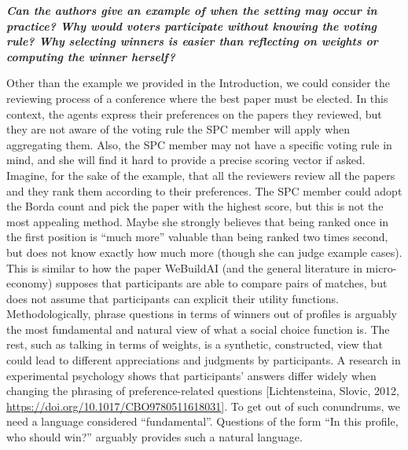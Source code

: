 \documentclass{article}
\begin{document}
\textit{\textbf{Can the authors give an example of when the setting may occur in practice? Why would voters participate without knowing the voting rule? Why selecting winners is easier than reflecting on weights or computing the winner herself?}}

Other than the example we provided in the Introduction, we could consider the reviewing process of a conference where the best paper must be elected. In this context, the agents express their preferences on the papers they reviewed, but they are not aware of the voting rule the SPC member will apply when aggregating them. %
Also, the SPC member may not have a specific voting rule in mind, and she will find it hard to provide a precise scoring vector if asked. Imagine, for the sake of the example, that all the reviewers review all the papers and they rank them according to their preferences. The SPC member could adopt the Borda count and pick the paper with the highest score, but this is not the most appealing method. Maybe she strongly believes that being ranked once in the first position is “much more” valuable than being ranked two times second, but does not know exactly how much more (though she can judge example cases). This is similar to how the paper WeBuildAI (and the general literature in micro-economy) supposes that participants are able to compare pairs of matches, but does not assume that participants can explicit their utility functions. Methodologically, phrase questions in terms of winners out of profiles is arguably the most fundamental and natural view of what a social choice function is. The rest, such as talking in terms of weights, is a synthetic, constructed, view that could lead to different appreciations and judgments by participants.
A research in experimental psychology shows that participants’ answers differ widely when changing the phrasing of preference-related questions [Lichtensteina, Slovic, 2012, \url{https://doi.org/10.1017/CBO9780511618031}].
To get out of such conundrums, we need a language considered “fundamental”. Questions of the form “In this profile, who should win?” arguably provides such a natural language.
\end{document}
